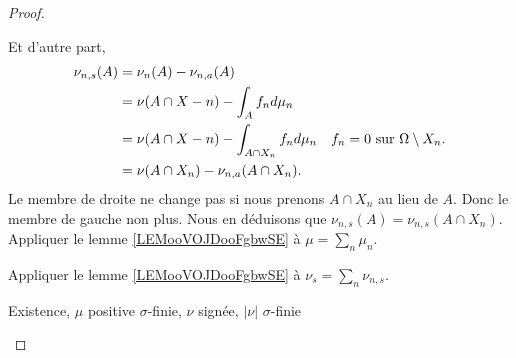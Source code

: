 \begin{proof}
\begin{subproof}
\begin{subproof}
			Et d'autre part,
			\begin{subequations}
				\begin{align}
					\nu_{n,s}(A) & = \nu_n(A)-\nu_{n,a}(A)                                                                       \\
					             & = \nu(A\cap X-n)-\int_A f_nd\mu_n                                                             \\
					             & = \nu(A\cap X-n)-\int_{A\cap X_n} f_nd\mu_n & \text{\( f_n=0\) sur \( \Omega\setminus X_n\).} \\
					             & = \nu(A\cap X_n)-\nu_{n,a}(A\cap X_n).
				\end{align}
			\end{subequations}
			Le membre de droite ne change pas si nous prenons \( A\cap X_n\) au lieu de \( A\). Donc le membre de gauche non plus. Nous en déduisons que \( \nu_{n,s}(A)=\nu_{n,s}(A\cap X_n)\).
			\spitem[\( \nu_{n,s}\perp \mu\)]
			Appliquer le lemme \ref{LEMooVOJDooFgbwSE} à \( \mu=\sum_n\mu_n\).

			\spitem[\( \nu_{s}\perp \mu\)]
			Appliquer le lemme \ref{LEMooVOJDooFgbwSE} à \( \nu_s=\sum_n\nu_{n,s}\).
		\end{subproof}
	\end{subproof}


	\begin{proofpart}
		Existence, \( \mu\) positive \( \sigma\)-finie, \( \nu\) signée, \( | \nu |\) \( \sigma\)-finie
	\end{proofpart}


\end{proof}
